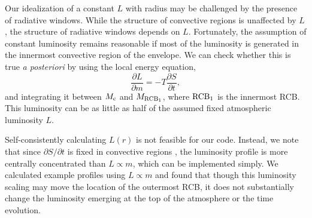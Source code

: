 
{Our idealization of a constant $L$ with radius may be challenged by the presence of radiative windows. While the structure of convective regions is unaffected by $L$, the structure of radiative windows depends on $L$. Fortunately, the assumption of constant luminosity remains reasonable if most of the luminosity is generated in the innermost convective region of the envelope. We can check whether this is true \textit{a posteriori} by using the local energy equation,
\begin{equation}
\label{eq:localen}
\frac{\partial L}{\partial m}=-T \frac{\partial S}{\partial t},
\end{equation}
and integrating it between $M_{\rm c}$ and $M_{\rm{RCB_1}}$, where $\rm{RCB_1}$ is the innermost RCB. This luminosity can be as little as half of the assumed fixed atmospheric luminosity $L$.

Self-consistently calculating $L(r)$ is not feasible for our code. Instead, we note that since  $\partial S/\partial t$ is fixed in convective regions \citep{arras06}, the luminosity profile is more centrally concentrated than $L \propto m$, which can be implemented simply.  We calculated example profiles using $L \propto m$ and found that though this luminosity scaling may move the location of the outermost RCB, it does not substantially change the luminosity emerging at the top of the atmosphere or the time evolution. %



}

